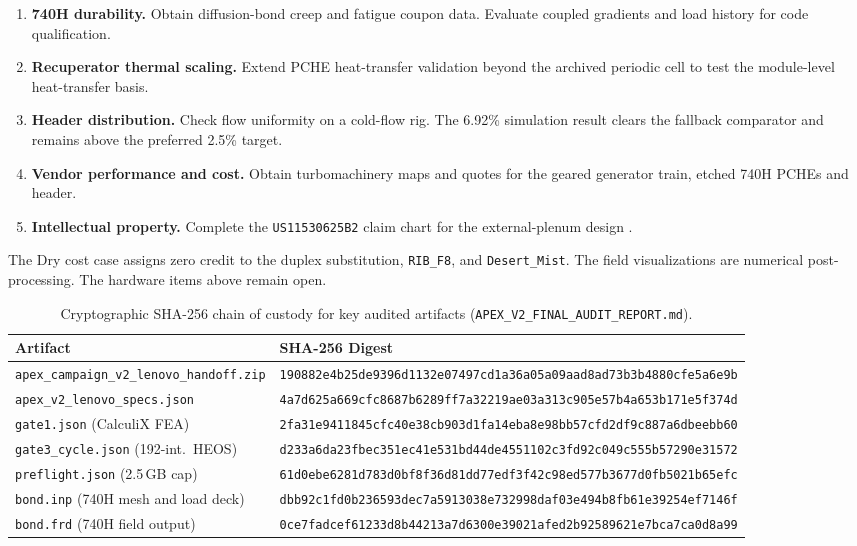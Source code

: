 \documentclass[10pt,a4paper]{article}
\begin{document}
\begin{enumerate}
  \item \textbf{740H durability.} Obtain diffusion-bond creep and fatigue coupon data. Evaluate coupled gradients and load history for code qualification.
  \item \textbf{Recuperator thermal scaling.} Extend PCHE heat-transfer validation beyond the archived periodic cell to test the module-level heat-transfer basis.
  \item \textbf{Header distribution.} Check flow uniformity on a cold-flow rig. The 6.92\% simulation result clears the fallback comparator and remains above the preferred 2.5\% target.
  \item \textbf{Vendor performance and cost.} Obtain turbomachinery maps and quotes for the geared generator train, etched 740H PCHEs and header.
  \item \textbf{Intellectual property.} Complete the \texttt{US11530625B2} claim chart for the external-plenum design \cite{us11530625}.
\end{enumerate}
The Dry cost case assigns zero credit to the duplex substitution, \texttt{RIB\_F8}, and \texttt{Desert\_Mist}. The field visualizations are numerical post-processing. The hardware items above remain open.

\begin{table}[H]
  \centering
  \caption{Cryptographic SHA-256 chain of custody for key audited artifacts (\texttt{APEX\_V2\_FINAL\_AUDIT\_REPORT.md}).}
  \label{tab:sha}
  \scriptsize\setlength{\tabcolsep}{4pt}
  \begin{tabularx}{\linewidth}{l X}
    \toprule
    \textbf{Artifact} & \textbf{SHA-256 Digest} \\
    \midrule
    \texttt{apex\_campaign\_v2\_lenovo\_handoff.zip} & \texttt{190882e4b25de9396d1132e07497cd1a36a05a09aad8ad73b3b4880cfe5a6e9b} \\
    \texttt{apex\_v2\_lenovo\_specs.json} & \texttt{4a7d625a669cfc8687b6289ff7a32219ae03a313c905e57b4a653b171e5f374d} \\
    \texttt{gate1.json} (CalculiX FEA) & \texttt{2fa31e9411845cfc40e38cb903d1fa14eba8e98bb57cfd2df9c887a6dbeebb60} \\
    \texttt{gate3\_cycle.json} (192-int.\ HEOS) & \texttt{d233a6da23fbec351ec41e531bd44de4551102c3fd92c049c555b57290e31572} \\
    \texttt{preflight.json} (2.5\,GB cap) & \texttt{61d0ebe6281d783d0bf8f36d81dd77edf3f42c98ed577b3677d0fb5021b65efc} \\
    \texttt{bond.inp} (740H mesh and load deck) & \texttt{dbb92c1fd0b236593dec7a5913038e732998daf03e494b8fb61e39254ef7146f} \\
    \texttt{bond.frd} (740H field output) & \texttt{0ce7fadcef61233d8b44213a7d6300e39021afed2b92589621e7bca7ca0d8a99} \\
    \bottomrule
  \end{tabularx}
\end{table}
\end{document}
